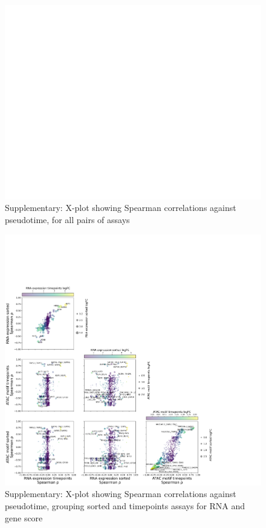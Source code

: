 \documentclass[a4paper]{article}
\begin{document}
\begin{figure}[!htb]
  \centering
  \includegraphics[width=\textwidth]{../figures/hematopoiesis/Erythroid_40_103_smooth_none_detailed_X_plot.png}
  \caption{Supplementary: X-plot showing Spearman correlations against pseudotime, for all pairs of assays}
\end{figure}

\begin{figure}[!htb]
  \centering
  \includegraphics[width=\textwidth]{../figures/hematopoiesis/Erythroid_40_103_smooth_none_semi_detailed_X_plot.png}
  \caption{Supplementary: X-plot showing Spearman correlations against pseudotime, grouping sorted and timepoints assays for RNA and gene score}
\end{figure}
\end{document}
